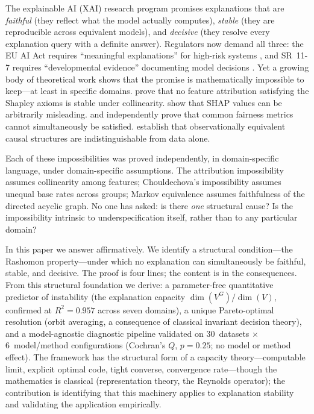 \documentclass[11pt,a4paper]{article}
\begin{document}
The explainable AI (XAI) research program promises explanations that are
\emph{faithful} (they reflect what the model actually computes),
\emph{stable} (they are reproducible across equivalent models), and
\emph{decisive} (they resolve every explanation query with a definite answer).
Regulators now demand all three: the EU AI Act requires ``meaningful
explanations'' for high-risk systems \citep{euaiact2024}, and SR~11-7 requires
``developmental evidence'' documenting model decisions
\citep{occ2011sr117}.  Yet a growing body of theoretical work shows that the
promise is mathematically impossible to keep---at least in specific domains.
\citet{bilodeau2024impossibility} prove that no feature attribution satisfying
the Shapley axioms is stable under collinearity.
\citet{huang2024failings} show that SHAP values can be arbitrarily
misleading.  \citet{chouldechova2017fair} and \citet{kleinberg2017inherent}
independently prove that common fairness metrics cannot simultaneously be
satisfied.  \citet{verma1991equivalence} establish that observationally
equivalent causal structures are indistinguishable from data alone.

Each of these impossibilities was proved independently, in domain-specific
language, under domain-specific assumptions.  The attribution impossibility
assumes collinearity among features; Chouldechova's impossibility assumes
unequal base rates across groups; Markov equivalence assumes faithfulness of
the directed acyclic graph.  No one has asked: is there \emph{one} structural
cause?  Is the impossibility intrinsic to underspecification itself, rather
than to any particular domain?

In this paper we answer affirmatively.  We identify a structural
condition---the Rashomon property---under which no explanation can
simultaneously be faithful, stable, and decisive.  The proof is four
lines; the content is in the consequences.  From this structural foundation
we derive: a parameter-free quantitative predictor of instability (the
explanation capacity $\dim(V^G)/\dim(V)$, confirmed at $R^2 = 0.957$
across seven domains), a unique Pareto-optimal resolution (orbit
averaging, a consequence of classical invariant decision theory), and a
model-agnostic diagnostic pipeline validated on 30~datasets $\times$
6~model/method configurations (Cochran's $Q$, $p = 0.25$; no model or
method effect).  The framework has the structural form of a capacity
theory---computable limit, explicit optimal code, tight converse,
convergence rate---though the mathematics is classical (representation
theory, the Reynolds operator); the contribution is identifying that
this machinery applies to explanation stability and validating the
application empirically.
\end{document}
